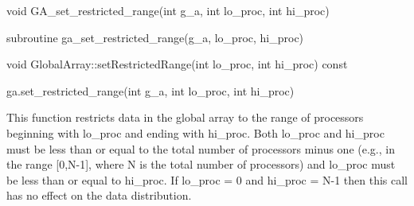 \documentclass[10pt]{article}
\begin{document}
\begin{capi}
\begin{ccode}
void GA_set_restricted_range(int g_a, int lo_proc, int hi_proc)
\end{ccode}
\begin{funcargs}
\end{funcargs}
\end{capi}

\begin{fapi}
\begin{fcode}
subroutine ga_set_restricted_range(g_a, lo_proc, hi_proc)
\end{fcode}
\begin{funcargs}
\end{funcargs}
\end{fapi}

\begin{cxxapi}
\begin{cxxcode}
void GlobalArray::setRestrictedRange(int lo_proc, int hi_proc) const
\end{cxxcode}
\begin{funcargs}
\end{funcargs}
\end{cxxapi}

\begin{pyapi}
\begin{pycode}
ga.set_restricted_range(int g_a, int lo_proc, int hi_proc)
\end{pycode}
\begin{funcargs}
\end{funcargs}
\end{pyapi}

\gcoll

\begin{desc}

This function restricts data in the global array to the range of processors
beginning with lo_proc and ending with hi_proc. Both lo_proc and hi_proc must
be less than or equal to the total number of processors minus one (e.g., in the
range [0,N-1], where N is the total number of processors) and lo_proc must be
less than or equal to hi_proc. If lo_proc = 0 and hi_proc = N-1 then this call
has no effect on the data distribution.

\end{desc}
\end{document}
